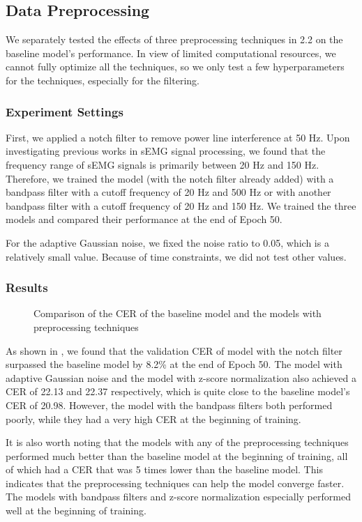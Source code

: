 \subsection{Data Preprocessing}

We separately tested the effects of three preprocessing techniques in 2.2 on the baseline model's performance.
In view of limited computational resources, we cannot fully optimize all the techniques,
so we only test a few hyperparameters for the techniques, especially for the filtering.

\subsubsection{Experiment Settings}
First, we applied a notch filter to remove power line interference at 50 Hz.
Upon investigating previous works in sEMG signal processing, we found that the frequency range of sEMG signals is primarily between 20 Hz and 150 Hz.
Therefore, we trained the model (with the notch filter already added) with a bandpass filter with a cutoff frequency of 20 Hz and 500 Hz or with another bandpass filter with a cutoff frequency of 20 Hz and 150 Hz.
We trained the three models and compared their performance at the end of Epoch 50.

For the adaptive Gaussian noise, we fixed the noise ratio  to 0.05, which is a relatively small value.
Because of time constraints, we did not test other values.

\subsubsection{Results}

\begin{figure}
    \centering
    \caption{Comparison of the CER of the baseline model and the models with preprocessing techniques}
\end{figure}
  

As shown in , we found that the validation CER of model with the notch filter surpassed the baseline model by 8.2\% at the end of Epoch 50.
The model with adaptive Gaussian noise and the model with z-score normalization also achieved a CER of 22.13 and 22.37 respectively, 
which is quite close to the baseline model's CER of 20.98.
However, the model with the bandpass filters both performed poorly, while they had a very high CER at the beginning of training.

It is also worth noting that the models with any of the preprocessing techniques performed much better than the baseline model at the beginning of training, 
all of which had a CER that was 5 times lower than the baseline model.
This indicates that the preprocessing techniques can help the model converge faster.
The models with bandpass filters and z-score normalization especially performed well at the beginning of training.
